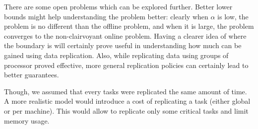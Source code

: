 \documentclass[10pt, conference, compsocconf]{IEEEtran}
\begin{document}
There are some open problems which can be explored further. Better
lower bounds might help understanding the problem better: clearly when
$\alpha$ is low, the problem is no different than the offline problem,
and when it is large, the problem converges to the non-clairvoyant
online problem. Having a clearer idea of where the boundary is will
certainly prove useful in understanding how much can be gained using
data replication. Also, while replicating data using groups of
processor proved effective, more general replication policies can
certainly lead to better guarantees.

Though, we assumed that every tasks were replicated the same amount of
time. A more realistic model would introduce a cost of replicating a
task (either global or per machine). This would allow to replicate
only some critical tasks and limit memory usage.


 
\end{document}
